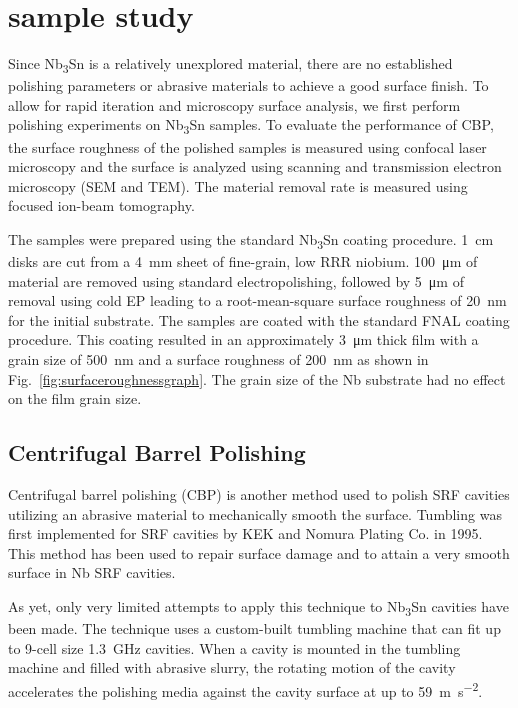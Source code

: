 %
\section{sample study}%
\label{sec:samplestudy}%
Since Nb\textsubscript{3}Sn is a relatively unexplored material, there are no established polishing parameters or abrasive materials to achieve a good surface finish. To allow for rapid iteration and microscopy surface analysis, we first perform polishing experiments on Nb\textsubscript{3}Sn samples. To evaluate the performance of CBP, the surface roughness of the polished samples is measured using confocal laser microscopy and the surface is analyzed using scanning and transmission electron microscopy (SEM and TEM). The material removal rate is measured using focused ion-beam tomography.

The samples were prepared using the standard Nb\textsubscript{3}Sn coating procedure. 1~\unit{\centi\metre} disks are cut from a 4~\unit{\milli\metre} sheet of fine-grain, low RRR niobium. 100~\unit{\micro\metre} of material are removed using standard electropolishing\cite{saito2003development}, followed by 5~\unit{\micro\metre} of removal using cold EP leading to a root-mean-square surface roughness of 20~nm for the initial substrate.\cite{crawford2017extreme} The samples are coated with the standard FNAL coating procedure.\cite{posen2017nb3sn} This coating resulted in an approximately 3~\unit{\micro\metre} thick film with a grain size of 500~\unit{\nano\metre} and a surface roughness of 200~nm as shown in Fig.~\ref{fig:surfaceroughnessgraph}. The grain size of the Nb substrate had no effect on the film grain size.
%
\subsection{Centrifugal Barrel Polishing}%
\label{subsec:CentrifugalBarrelPolishing}%
Centrifugal barrel polishing (CBP) is another method used to polish SRF cavities utilizing an abrasive material to mechanically smooth the surface. Tumbling was first implemented for SRF cavities by KEK and Nomura Plating Co. in 1995\cite{higuchi1996investigation}. This method has been used to repair surface damage and to attain a very smooth surface in Nb SRF cavities\cite{cooper2012mirror, cooper2011centrifugal}. 

As yet, only very limited attempts to apply this technique to Nb\textsubscript{3}Sn cavities have been made. The technique uses a custom-built tumbling machine that can fit up to 9-cell size 1.3~GHz cavities. When a cavity is mounted in the tumbling machine and filled with abrasive slurry, the rotating motion of the cavity accelerates the polishing media against the cavity surface at up to 59~\unit{\metre\per\square\second}. 

